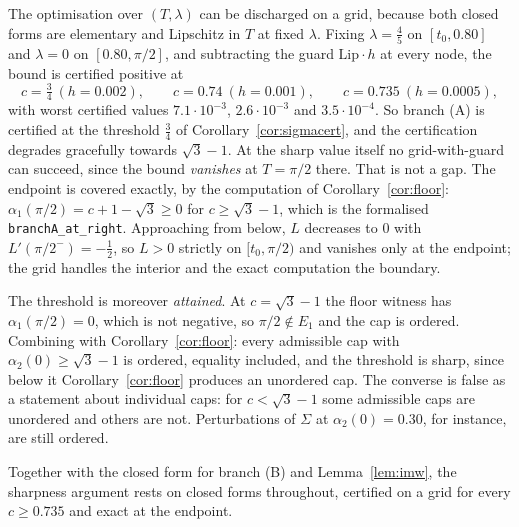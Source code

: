 \documentclass[11pt]{article}
\theoremstyle{definition}
\newcommand{\Sig}{\Sigma}
\begin{document}
The optimisation over $(T,\lambda)$ can be discharged on a grid, because both closed forms
are elementary and Lipschitz in $T$ at fixed $\lambda$. Fixing $\lambda=\tfrac45$ on
$[t_0,0.80]$ and $\lambda=0$ on $[0.80,\pi/2]$, and subtracting the guard $\mathrm{Lip}\cdot h$
at every node, the bound is certified positive at
\[
  c=\tfrac34\ (h=0.002),\qquad c=0.74\ (h=0.001),\qquad c=0.735\ (h=0.0005),
\]
with worst certified values $7.1\cdot10^{-3}$, $2.6\cdot10^{-3}$ and $3.5\cdot10^{-4}$. So
branch (A) is certified at the threshold $\tfrac34$ of
Corollary~\ref{cor:sigmacert}, and the certification degrades gracefully towards
$\sqrt3-1$. At the sharp value itself no grid-with-guard can succeed, since the bound \emph{vanishes}
at $T=\pi/2$ there. That is not a gap. The endpoint is covered exactly, by the computation
of Corollary~\ref{cor:floor}: $\alpha_1(\pi/2)=c+1-\sqrt3\ge0$ for $c\ge\sqrt3-1$, which is
the formalised \texttt{branchA\_at\_right}. Approaching from below, $L$ decreases to $0$
with $L'(\pi/2^-)=-\tfrac12$, so $L>0$ strictly on $[t_0,\pi/2)$ and vanishes only at the
endpoint; the grid handles the interior and the exact computation the boundary.

The threshold is moreover \emph{attained}. At $c=\sqrt3-1$ the floor witness has
$\alpha_1(\pi/2)=0$, which is not negative, so $\pi/2\notin E_1$ and the cap is ordered.
Combining with Corollary~\ref{cor:floor}: every admissible cap with
$\alpha_2(0)\ge\sqrt3-1$ is ordered, equality included, and the threshold is sharp, since
below it Corollary~\ref{cor:floor} produces an unordered cap. The converse is false as a
statement about individual caps: for $c<\sqrt3-1$ some admissible caps are unordered and
others are not. Perturbations of $\Sig$ at $\alpha_2(0)=0.30$, for instance, are still
ordered.

Together with the closed form for branch (B) and Lemma~\ref{lem:imw}, the sharpness
argument rests on closed forms throughout, certified on a grid for every $c\ge0.735$ and
exact at the endpoint.
\end{document}

